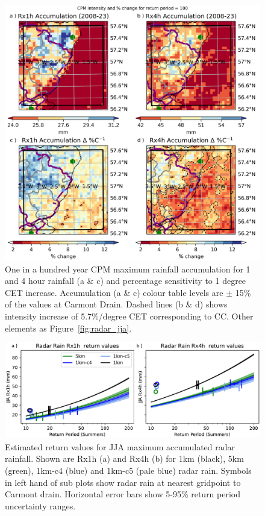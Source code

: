 \documentclass[11pt,a4paper]{article}
\begin{document}
\begin{figure}
	\centering
	\includegraphics[width=1\linewidth]{cpm_intensity_delta}
	\caption{One in a hundred year CPM maximum rainfall accumulation for 1 and 4 hour rainfall (a \& c) and percentage sensitivity to 1 degree CET increase. Accumulation (a \& c) colour table levels are $\pm$ 15\% of the values at Carmont Drain. Dashed lines (b \& d) shows intensity increase of 5.7\%/degree CET corresponding to CC. Other elements as Figure~\ref{fig:radar_jja}.  }
	\label{fig:map_intensity}
\end{figure}

\begin{figure}
	\centering
	\includegraphics[width=\linewidth]{radar_return_prds}
	\caption{Estimated return values for  JJA maximum accumulated radar rainfall. Shown are Rx1h (a) and Rx4h (b) for 1km  (black),  5km (green), 1km-c4 (blue) and 1km-c5 (pale blue) radar rain. Symbols in left hand of sub plots show radar rain at nearest gridpoint to Carmont drain. Horizontal error bars show 5-95\% return period uncertainty ranges. }
	\label{fig:radar_rtn_prd}
\end{figure}
\end{document}
